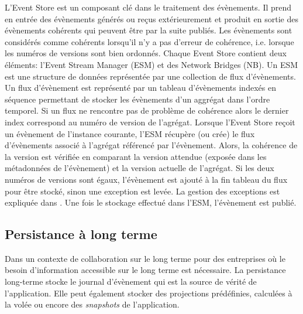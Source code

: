 L'Event Store est un composant clé dans le traitement des évènements. Il prend 
en entrée des évènements générés ou reçus extérieurement et produit en sortie 
des évènements cohérents qui peuvent être par la suite publiés. Les évènements 
sont considérés comme cohérents lorsqu'il n'y a pas d'erreur de cohérence, i.e. 
lorsque les numéros de versions sont bien ordonnés. Chaque Event Store contient 
deux éléments: l'Event Stream Manager (ESM) et des Network Bridges (NB). Un
ESM est une structure de données représentée par une collection de flux 
d'évènements. Un flux d'évènement est représenté par un tableau d'évènements 
indexés en séquence permettant de stocker les évènements d'un aggrégat dans 
l'ordre temporel. Si un flux ne rencontre pas de problème de cohérence alors le 
dernier index correspond au numéro de version de l'agrégat. Lorsque l'Event Store 
reçoit un évènement de l'instance courante, l'ESM récupère (ou crée) le flux d'évènements associé à l'agrégat 
référencé par l'évènement. Alors, la cohérence de la version est vérifiée en 
comparant la version attendue (exposée dans les métadonnées de l'évènement) 
et la version actuelle de l'agrégat. Si les deux numéros de versions sont égaux, 
l'évènement est ajouté à la fin tableau du flux pour être stocké, sinon une 
exception est levée. La gestion des exceptions est expliquée dans . Une fois le stockage effectué dans l'ESM, l'évènement est publié.



\subsection{Persistance à long terme}\label{sec:persistance-a-long-terme}
Dans un contexte de collaboration sur le long terme pour des entreprises où le 
besoin d'information accessible sur le long terme est nécessaire. La persistance 
long-terme stocke le journal d'évènement qui est la 
source de vérité de l'application. Elle peut également stocker des projections 
prédéfinies, calculées à la volée ou encore des \textit{snapshots} de l'application.

